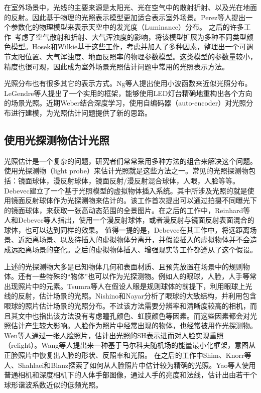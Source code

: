 在室外场景中，光线的主要来源是太阳光、光在空气中的散射折射、以及光在地面的反射。因此基于物理的光照表示模型更加适合表示室外场景。Perez等人\cite{perez1993all}提出一个参数化的物理模型来表示天空中的发光度（Luminance）分布。
之后的许多工作~\cite{nishita1996display, sirai1993display, preetham1999practical,raab2008unbiased}考虑了空气散射和折射、大气浑浊度的影响，将该模型扩展为多种不同类型颜色模型。Hosek和Wilkie\cite{hosek2012analytic, hovsekhovsek2013adding}基于这些工作，考虑并加入了多种因素，整理出一个可调节太阳位置、大气浑浊度、地面反照率的物理参数模型。这类模型的参数量较小，精度也很可观，因此成为室外场景光照估计问题中常用的光照表示方法。

光照分布也有很多其它的表示方式。Ng等人\cite{ng2003all}提出使用小波函数来近似光照分布。LeGendre等人\cite{legendre2016practical}提出了一个实用的框架，能够使用LED灯台精确地重构出各个方向的场景光照。近期Weber\cite{weber2018learning}结合深度学习，使用自编码器（auto-encoder）对光照分布进行建模，为光照估计问题提供了新的思路。

\subsection{使用光探测物估计光照} 
光照估计是一个复杂的问题，研究者们常常采用多种方法的组合来解决这个问题。使用光探测物（light probe）来估计光照就是这些方法之一。常见的光照探测物包括：镜面球体，漫反射球体，镜面反射/漫反射混合球体，人眼，人脸等等。Debevec\cite{debevec1998rendering}建立了一个基于光照模型的虚拟物体插入系统。其中所涉及光照的就是使用镜面反射球体作为光探测物来估计的。该工作首次提出可以通过拍摄不同曝光下的镜面球体，来获取一张高动态范围的全景图片。在之后的工作中，Reinhard等人\cite{reinhard2005high}和Debevec等人\cite{debevec2012single}指出，使用一个漫反射球体，或者漫反射与镜面反射表面混合的球体，也可以达到同样的效果。 值得一提的是，Debevec在其工作\cite{debevec1998rendering}中，将远距离场景、近距离场景、以及待插入的虚拟物体分离开，并假设插入的虚拟物体并不会造成远距离场景的变化。之后的虚拟物体插入、增强现实等工作都遵从了这个假设。

上述的光探测物大多是已知物体几何和表面材质、且预先放置在场景中的规则物体。还有一些特殊的“物体”也可以作为光探测物。例如人的眼球，人脸，人手等常出现照片中的元素。Tsumra等人\cite{tsumura2003estimating}在假设人眼是规则球体的前提下，利用眼球上光线的反射，估计场景的光照。Nishino和Nayar\cite{nishino2004eyes}分析了眼球的大致结构，并利用包含眼球的照片估计场景的光照分布。不过该方法需要分辨率和清晰度较高的相机，而且其文中也指出该方法没有考虑瞳孔颜色、虹膜颜色等因素。而这些因素都会对光照估计产生较大影响。人脸作为照片中经常出现的物体，也经常被用作光探测物。
Wen等人\cite{wen2003face}通过一张人脸照片，估计出光照的SH表示进而对人脸实现重照（relight）。Wang等人\cite{wang2007face}提出来一种基于马尔科夫随机场的能量最小化框架，意图从正脸照片中恢复出人脸的形状、反照率和光照。   
在之后的工作中Shim\cite{shim2012faces}、Knorr等人\cite{knorr2014real}、Shahlaei和Blanz\cite{shahlaei2015realistic}探索了如何从人脸照片中估计较为精确的光照。Yao等人\cite{yao2013hand}使用普通相机和深度相机下的人体手部图像，通过人手的亮度和法线，估计出由若干个球形谐波系数近似的低频光照。

